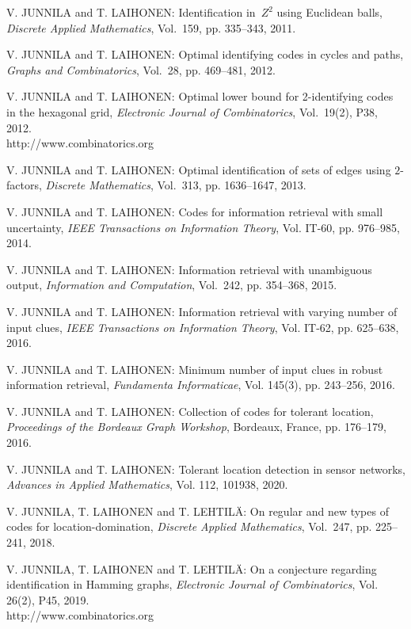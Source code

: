\begin{thebibliography}{999}
V. JUNNILA and T. LAIHONEN: Identification in~$Z^2$ using Euclidean balls, {\it Discrete Applied Mathematics}, Vol.~159, pp. 335--343, 2011.
  
V. JUNNILA and T. LAIHONEN: Optimal identifying codes in cycles and paths, {\it Graphs and Combinatorics}, Vol.~28, pp. 469--481, 2012.

V. JUNNILA and T. LAIHONEN: Optimal lower bound for 2-identifying codes in the hexagonal grid, {\it Electronic Journal of Combinatorics}, Vol.~19(2), P38, 2012.\\
http://www.combinatorics.org

V. JUNNILA and T. LAIHONEN: Optimal identification of sets of edges using $2$-factors, {\it Discrete Mathematics}, Vol.~313, pp. 1636--1647, 2013.

V. JUNNILA and T. LAIHONEN: Codes for information retrieval with small uncertainty, {\it IEEE Transactions on Information Theory}, Vol. IT-60, pp. 976--985, 2014.

  V. JUNNILA and T. LAIHONEN: Information retrieval with unambiguous output, {\it Information and Computation}, Vol.~242, pp. 354--368, 2015.

V. JUNNILA and T. LAIHONEN: Information retrieval with varying number of input clues, {\it IEEE Transactions on Information Theory}, Vol. IT-62, pp. 625--638, 2016.  

V. JUNNILA and T. LAIHONEN: Minimum number of input clues in robust information retrieval, {\it Fundamenta Informaticae}, Vol. 145(3), pp. 243--256, 2016.

V. JUNNILA and T. LAIHONEN: Collection of codes for tolerant location, {\it Proceedings of the Bordeaux Graph Workshop}, Bordeaux, France, pp. 176--179, 2016.

V. JUNNILA and T. LAIHONEN: Tolerant location detection in sensor networks, {\it Advances in Applied Mathematics}, Vol. 112, 101938, 2020.

V. JUNNILA, T. LAIHONEN and T. LEHTIL\"A: On regular and new types of codes for location-domination, {\it Discrete Applied Mathematics}, Vol.~247, pp. 225--241, 2018.

V. JUNNILA, T. LAIHONEN and T. LEHTIL\"A: On a conjecture regarding identification in Hamming graphs, {\it Electronic Journal of Combinatorics}, Vol. 26(2), P45, 2019.\\
http://www.combinatorics.org


\end{thebibliography}
